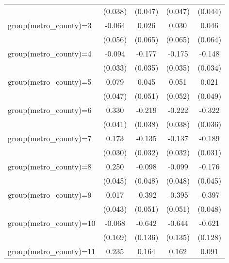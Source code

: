 {\begin{tabular}{l*{4}{c}}
                    &     (0.038)         &     (0.047)         &     (0.047)         &     (0.044)         \\
group(metro\_county)=3&      -0.064         &       0.026         &       0.030         &       0.046         \\
                    &     (0.056)         &     (0.065)         &     (0.065)         &     (0.064)         \\
group(metro\_county)=4&      -0.094\sym{***}&      -0.177\sym{***}&      -0.175\sym{***}&      -0.148\sym{***}\\
                    &     (0.033)         &     (0.035)         &     (0.035)         &     (0.034)         \\
group(metro\_county)=5&       0.079\sym{*}  &       0.045         &       0.051         &       0.021         \\
                    &     (0.047)         &     (0.051)         &     (0.052)         &     (0.049)         \\
group(metro\_county)=6&       0.330\sym{***}&      -0.219\sym{***}&      -0.222\sym{***}&      -0.322\sym{***}\\
                    &     (0.041)         &     (0.038)         &     (0.038)         &     (0.036)         \\
group(metro\_county)=7&       0.173\sym{***}&      -0.135\sym{***}&      -0.137\sym{***}&      -0.189\sym{***}\\
                    &     (0.030)         &     (0.032)         &     (0.032)         &     (0.031)         \\
group(metro\_county)=8&       0.250\sym{***}&      -0.098\sym{**} &      -0.099\sym{**} &      -0.176\sym{***}\\
                    &     (0.045)         &     (0.048)         &     (0.048)         &     (0.045)         \\
group(metro\_county)=9&       0.017         &      -0.392\sym{***}&      -0.395\sym{***}&      -0.397\sym{***}\\
                    &     (0.043)         &     (0.051)         &     (0.051)         &     (0.048)         \\
group(metro\_county)=10&      -0.068         &      -0.642\sym{***}&      -0.644\sym{***}&      -0.621\sym{***}\\
                    &     (0.169)         &     (0.136)         &     (0.135)         &     (0.128)         \\
group(metro\_county)=11&       0.235\sym{***}&       0.164\sym{***}&       0.162\sym{***}&       0.091\sym{**} \\

\end{tabular}}
